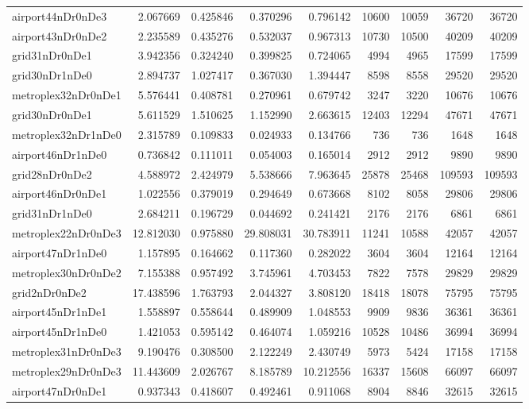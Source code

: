 \begin{longtable}{|l|r|r|r|r|r|r|r|r|}
airport44nDr0nDe3 & 2.067669 & 0.425846 & 0.370296 & 0.796142 & 10600 & 10059 & 36720 & 36720 \\
airport43nDr0nDe2 & 2.235589 & 0.435276 & 0.532037 & 0.967313 & 10730 & 10500 & 40209 & 40209 \\
grid31nDr0nDe1 & 3.942356 & 0.324240 & 0.399825 & 0.724065 & 4994 & 4965 & 17599 & 17599 \\
grid30nDr1nDe0 & 2.894737 & 1.027417 & 0.367030 & 1.394447 & 8598 & 8558 & 29520 & 29520 \\
metroplex32nDr0nDe1 & 5.576441 & 0.408781 & 0.270961 & 0.679742 & 3247 & 3220 & 10676 & 10676 \\
grid30nDr0nDe1 & 5.611529 & 1.510625 & 1.152990 & 2.663615 & 12403 & 12294 & 47671 & 47671 \\
metroplex32nDr1nDe0 & 2.315789 & 0.109833 & 0.024933 & 0.134766 & 736 & 736 & 1648 & 1648 \\
airport46nDr1nDe0 & 0.736842 & 0.111011 & 0.054003 & 0.165014 & 2912 & 2912 & 9890 & 9890 \\
grid28nDr0nDe2 & 4.588972 & 2.424979 & 5.538666 & 7.963645 & 25878 & 25468 & 109593 & 109593 \\
airport46nDr0nDe1 & 1.022556 & 0.379019 & 0.294649 & 0.673668 & 8102 & 8058 & 29806 & 29806 \\
grid31nDr1nDe0 & 2.684211 & 0.196729 & 0.044692 & 0.241421 & 2176 & 2176 & 6861 & 6861 \\
metroplex22nDr0nDe3 & 12.812030 & 0.975880 & 29.808031 & 30.783911 & 11241 & 10588 & 42057 & 42057 \\
airport47nDr1nDe0 & 1.157895 & 0.164662 & 0.117360 & 0.282022 & 3604 & 3604 & 12164 & 12164 \\
metroplex30nDr0nDe2 & 7.155388 & 0.957492 & 3.745961 & 4.703453 & 7822 & 7578 & 29829 & 29829 \\
grid2nDr0nDe2 & 17.438596 & 1.763793 & 2.044327 & 3.808120 & 18418 & 18078 & 75795 & 75795 \\
airport45nDr1nDe1 & 1.558897 & 0.558644 & 0.489909 & 1.048553 & 9909 & 9836 & 36361 & 36361 \\
airport45nDr1nDe0 & 1.421053 & 0.595142 & 0.464074 & 1.059216 & 10528 & 10486 & 36994 & 36994 \\
metroplex31nDr0nDe3 & 9.190476 & 0.308500 & 2.122249 & 2.430749 & 5973 & 5424 & 17158 & 17158 \\
metroplex29nDr0nDe3 & 11.443609 & 2.026767 & 8.185789 & 10.212556 & 16337 & 15608 & 66097 & 66097 \\
airport47nDr0nDe1 & 0.937343 & 0.418607 & 0.492461 & 0.911068 & 8904 & 8846 & 32615 & 32615 \\

\end{longtable}
